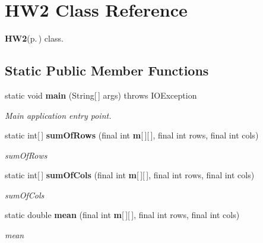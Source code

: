 \section{HW2 Class Reference}
\label{class_h_w2}
{\bf HW2}{\rm (p.\,\pageref{class_h_w2})} class.  


\subsection*{Static Public Member Functions}
\begin{CompactItemize}
\item 
static void {\bf main} (String[$\,$] args)  throws IOException 
\begin{CompactList}\small\item\em Main application entry point. \item\end{CompactList}\item 
static int[$\,$] {\bf sum\-Of\-Rows} (final int {\bf m}[$\,$][$\,$], final int rows, final int cols)
\begin{CompactList}\small\item\em sum\-Of\-Rows \item\end{CompactList}\item 
static int[$\,$] {\bf sum\-Of\-Cols} (final int {\bf m}[$\,$][$\,$], final int rows, final int cols)
\begin{CompactList}\small\item\em sum\-Of\-Cols \item\end{CompactList}\item 
static double {\bf mean} (final int {\bf m}[$\,$][$\,$], final int rows, final int cols)
\begin{CompactList}\small\item\em mean \item\end{CompactList}\end{CompactItemize}
